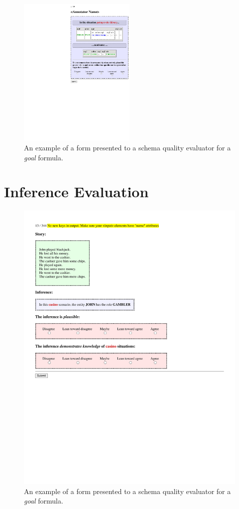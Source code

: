 \begin{figure}
    \centering
    \includegraphics[width=0.5\textwidth]{CH4_learning/evaleg4.pdf}
    \caption{An example of a form presented to a schema quality evaluator for a \textit{goal} formula.}
    \label{fig:goal_eval_eg}
\end{figure}

\section{Inference Evaluation}
\label{sec:inf_eval}

\begin{figure}
    \centering
    \includegraphics[width=\textwidth]{CH5_eval/role_inf.pdf}
    \caption{An example of a form presented to a schema quality evaluator for a \textit{goal} formula.}
    \label{fig:role_inf_eval}
\end{figure}

